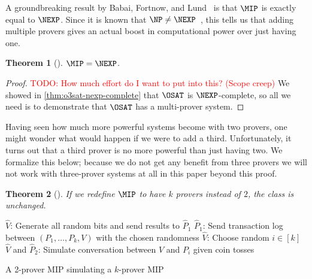 \documentclass[english,12pt]{reedthesis}
\theoremstyle{plain}
\newtheorem{thm}{Theorem}[section]
\theoremstyle{definition}
\theoremstyle{remark}
\newcommand{\TODO}[1]{\textcolor{red}{TODO: #1}}
\begin{document}
A groundbreaking result by Babai, Fortnow, and Lund~\cite{BFL90} is that $\MIP$
is exactly equal to $\NEXP$. Since it is known that $\NP \ne \NEXP$~\cite{Cook73},
this tells us that adding multiple provers gives an actual boost in
computational power over just having one.

\begin{thm}[{\cite{BFL90}}]\label{thm:mip-is-nexp}
  $\MIP = \NEXP$.
\end{thm}

\begin{proof}
  \TODO{How much effort do I want to put into this? (Scope creep)}
  We showed in \cref{thm:o3sat-nexp-complete} that $\OSAT$ is $\NEXP$-complete,
  so all we need is to demonstrate that $\OSAT$ has a multi-prover system.
\end{proof}

Having seen how much more powerful systems become with two provers, one might
wonder what would happen if we were to add a third. Unfortunately, it turns out
that a third prover is no more powerful than just having two. We formalize this
below; because we do not get any benefit from three provers we will not work
with three-prover systems at all in this paper beyond this proof.

\begin{thm}[{\cite[Theorem 4]{BGKW88}}]\label{thm:mip-unchanged}
  If we redefine $\MIP$ to have $k$ provers instead of $2$, the class is unchanged.
\end{thm}

\begin{algorithm}[htbp]
  $\hat{V}$: Generate all random bits and send results to $\hat{P}_{1}$\;
  $\hat{P}_{1}$: Send transaction log between $(P_{1}, \ldots, P_{k}, V)$ with the
  chosen randomness\;
  $\hat{V}$: Choose random $i \in [k]$\;
  $\hat{V}$ and $\hat{P}_{2}$: Simulate conversation between $V$ and $P_{i}$
  given coin tosses\;
  \caption{A 2-prover MIP simulating a $k$-prover MIP}\label{alg:2-prover-sim-k}
\end{algorithm}
\end{document}
